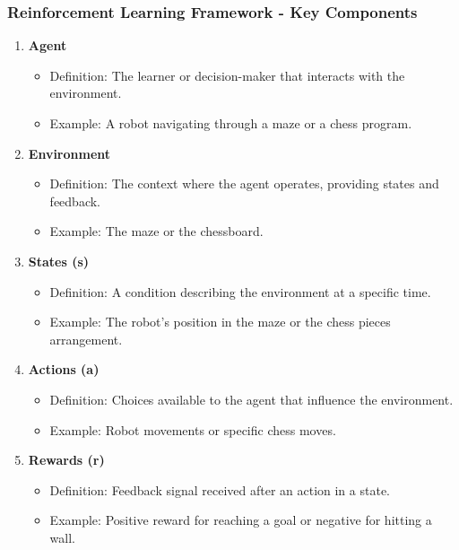 \documentclass[aspectratio=169]{beamer}
\begin{document}
\begin{frame}[fragile]
    \frametitle{Reinforcement Learning Framework - Key Components}
    \begin{enumerate}
        \item \textbf{Agent}
            \begin{itemize}
                \item Definition: The learner or decision-maker that interacts with the environment.
                \item Example: A robot navigating through a maze or a chess program.
            \end{itemize}
        \item \textbf{Environment}
            \begin{itemize}
                \item Definition: The context where the agent operates, providing states and feedback.
                \item Example: The maze or the chessboard.
            \end{itemize}
        \item \textbf{States (s)}
            \begin{itemize}
                \item Definition: A condition describing the environment at a specific time.
                \item Example: The robot's position in the maze or the chess pieces arrangement.
            \end{itemize}
        \item \textbf{Actions (a)}
            \begin{itemize}
                \item Definition: Choices available to the agent that influence the environment.
                \item Example: Robot movements or specific chess moves.
            \end{itemize}
        \item \textbf{Rewards (r)}
            \begin{itemize}
                \item Definition: Feedback signal received after an action in a state.
                \item Example: Positive reward for reaching a goal or negative for hitting a wall.
            \end{itemize}
    \end{enumerate}
\end{frame}
\end{document}
